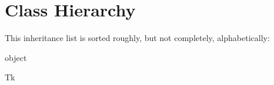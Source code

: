 \section{Class Hierarchy}
This inheritance list is sorted roughly, but not completely, alphabetically\+:\begin{DoxyCompactList}
\item object\begin{DoxyCompactList}
\item {}
\end{DoxyCompactList}
\item {}
\item Tk\begin{DoxyCompactList}
\item {}
\end{DoxyCompactList}
\end{DoxyCompactList}
